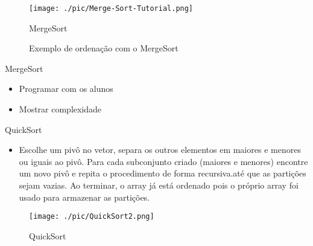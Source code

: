 \begin{frame}	
	\begin{block}{}	
		 \begin{figure}[!htb]
			\centering	  				
			\texttt{[image: ./pic/Merge-Sort-Tutorial.png]}
			\caption{MergeSort \cite{GEEKS_2018}}
			\label{fig_merge}
		\end{figure}
	\end{block}
\end{frame}

\begin{frame}{}
	\begin{figure}[h!]
		\centering    
		  \caption{Exemplo de ordenação com o MergeSort \cite{GEEKS_2018}}
	 \end{figure} 
\end{frame}

\begin{frame}
	\begin{block}{MergeSort}
		\begin{itemize}
			\item Programar com os alunos
			\item Mostrar complexidade
		\end{itemize}
	\end{block}
\end{frame}


\begin{frame}
	\begin{block}{QuickSort}
		\begin{itemize}
			\item Escolhe um pivô no vetor, separa os outros elementos em maiores e menores ou iguais ao pivô. Para cada subconjunto criado (maiores e menores) encontre um novo pivô e repita o procedimento de forma recursiva.até que as partições sejam vazias. Ao terminar, o array já está ordenado pois o próprio array foi usado para armazenar as partições.
		\end{itemize}
	\end{block}
\end{frame}


\begin{frame}	
	\begin{block}{}	
		 \begin{figure}[!htb]
			\centering	  				
			\texttt{[image: ./pic/QuickSort2.png]}
			\caption{QuickSort \cite{GEEKS_2018}}
			\label{fig_merge}
		\end{figure}
	\end{block}
\end{frame}

